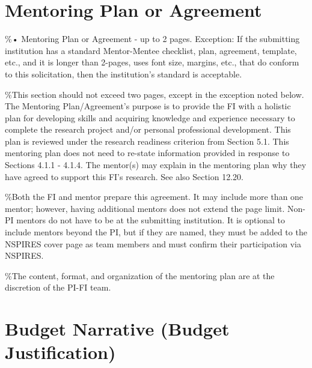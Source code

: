 \documentclass[
  letterpaper,
  DIV=11,
  numbers=noendperiod,
  oneside]{scrartcl}
\begin{document}
\section{Mentoring Plan or Agreement}\label{mentoring-plan-or-agreement}

\begin{tcolorbox}[enhanced jigsaw, breakable, colframe=quarto-callout-note-color-frame, colback=white, titlerule=0mm, left=2mm, leftrule=.75mm, opacitybacktitle=0.6, coltitle=black, title=\textcolor{quarto-callout-note-color}{\faInfo}\hspace{0.5em}{Note}, bottomtitle=1mm, toprule=.15mm, arc=.35mm, toptitle=1mm, rightrule=.15mm, opacityback=0, colbacktitle=quarto-callout-note-color!10!white, bottomrule=.15mm]

\%• Mentoring Plan or Agreement - up to 2 pages. Exception: If the
submitting institution has a standard Mentor-Mentee checklist, plan,
agreement, template, etc., and it is longer than 2-pages, uses font
size, margins, etc., that do conform to this solicitation, then the
institution's standard is acceptable.

\%This section should not exceed two pages, except in the exception
noted below. The Mentoring Plan/Agreement's purpose is to provide the FI
with a holistic plan for developing skills and acquiring knowledge and
experience necessary to complete the research project and/or personal
professional development. This plan is reviewed under the research
readiness criterion from Section 5.1. This mentoring plan does not need
to re-state information provided in response to Sections 4.1.1 - 4.1.4.
The mentor(s) may explain in the mentoring plan why they have agreed to
support this FI's research. See also Section 12.20.

\%Both the FI and mentor prepare this agreement. It may include more
than one mentor; however, having additional mentors does not extend the
page limit. Non-PI mentors do not have to be at the submitting
institution. It is optional to include mentors beyond the PI, but if
they are named, they must be added to the NSPIRES cover page as team
members and must confirm their participation via NSPIRES.

\%The content, format, and organization of the mentoring plan are at the
discretion of the PI-FI team.

\end{tcolorbox}

\section{Budget Narrative (Budget
Justification)}\label{budget-narrative-budget-justification}
\end{document}
